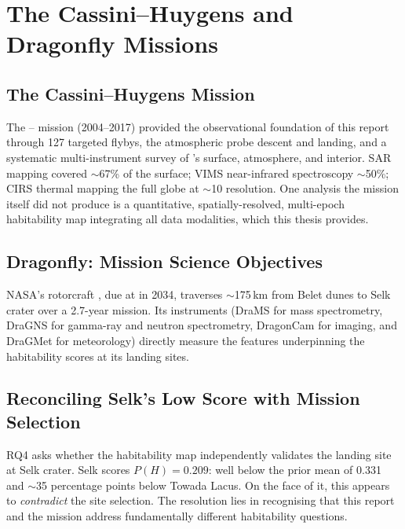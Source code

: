 
\chapter{The Cassini--Huygens and Dragonfly Missions}
\label{app:dragonfly}

\section{The Cassini--Huygens Mission}
\label{sec:cassini_mission}

The \cassini{}--\huygens{} mission (2004--2017) provided the observational foundation of this report through 127 targeted \titan{} flybys, the \huygens{} atmospheric probe descent and landing, and a systematic multi-instrument survey of \titan{}'s surface, atmosphere, and interior.  SAR mapping covered $\sim$67\% of the surface; VIMS near-infrared spectroscopy $\sim$50\%; CIRS thermal mapping the full globe at $\sim$10\textdegree{} resolution.  One analysis the mission itself did not produce is a quantitative, spatially-resolved, multi-epoch habitability map integrating all data modalities, which this thesis provides.

\section{Dragonfly: Mission Science Objectives}
\label{sec:dragonfly_objectives}

NASA's \dragonfly{} rotorcraft \citep{Lorenz2018Dragonfly}, due at \titan{} in 2034, traverses $\sim$175\,km from Belet dunes to Selk crater over a 2.7-year mission.  Its instruments (DraMS for mass spectrometry, DraGNS for gamma-ray and neutron spectrometry, DragonCam for imaging, and DraGMet for meteorology) directly measure the features underpinning the habitability scores at its landing sites.

\section{Reconciling Selk's Low Score with Mission Selection}
\label{sec:two_frameworks}

RQ4 asks whether the habitability map independently validates the
\dragonfly{} landing site at Selk crater.  Selk scores
$P(H) = 0.209$: well below the prior mean of 0.331 and
$\sim$35 percentage points below Towada Lacus.  On the face of it,
this appears to \textit{contradict} the site selection.  The resolution
lies in recognising that this report and the \dragonfly{} mission
address fundamentally different habitability questions.

